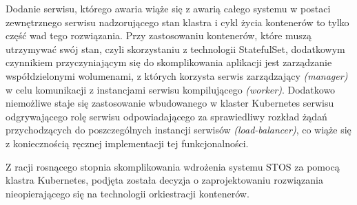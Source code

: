 Dodanie serwisu, którego awaria wiąże się z awarią całego systemu w postaci zewnętrznego serwisu nadzorującego stan klastra i cykl życia kontenerów to tylko część wad tego rozwiązania. Przy zastosowaniu kontenerów, które muszą utrzymywać swój stan, czyli skorzystaniu z technologii StatefulSet, dodatkowym czynnikiem przyczyniającym się do skomplikowania aplikacji jest zarządzanie współdzielonymi wolumenami, z których korzysta serwis zarządzający \textit{(manager)} w celu komunikacji z instancjami serwisu kompilującego \textit{(worker)}. Dodatkowo niemożliwe staje się zastosowanie wbudowanego w klaster Kubernetes serwisu odgrywającego rolę serwisu odpowiadającego za sprawiedliwy rozkład żądań przychodzących do poszczególnych instancji serwisów \textit{(load-balancer)}, co wiąże się z koniecznością ręcznej implementacji tej funkcjonalności.

Z racji rosnącego stopnia skomplikowania wdrożenia systemu STOS za pomocą klastra Kubernetes, podjęta została decyzja o zaprojektowaniu rozwiązania nieopierającego się na technologii orkiestracji kontenerów.
